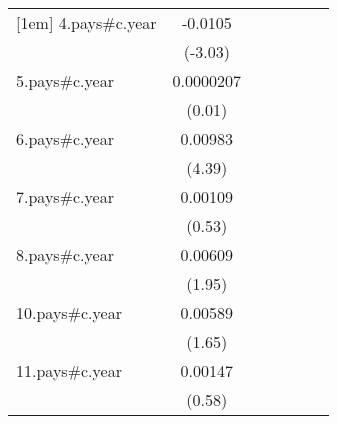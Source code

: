 {\begin{tabular}{l*{6}{c}}
[1em]
4.pays#c.year       &     -0.0105\sym{**} &                     &                     &                     &                     &                     \\
                    &     (-3.03)         &                     &                     &                     &                     &                     \\
[1em]
5.pays#c.year       &   0.0000207         &                     &                     &                     &                     &                     \\
                    &      (0.01)         &                     &                     &                     &                     &                     \\
[1em]
6.pays#c.year       &     0.00983\sym{***}&                     &                     &                     &                     &                     \\
                    &      (4.39)         &                     &                     &                     &                     &                     \\
[1em]
7.pays#c.year       &     0.00109         &                     &                     &                     &                     &                     \\
                    &      (0.53)         &                     &                     &                     &                     &                     \\
[1em]
8.pays#c.year       &     0.00609         &                     &                     &                     &                     &                     \\
                    &      (1.95)         &                     &                     &                     &                     &                     \\
[1em]
10.pays#c.year      &     0.00589         &                     &                     &                     &                     &                     \\
                    &      (1.65)         &                     &                     &                     &                     &                     \\
[1em]
11.pays#c.year      &     0.00147         &                     &                     &                     &                     &                     \\
                    &      (0.58)         &                     &                     &                     &                     &                     \\

\end{tabular}}
